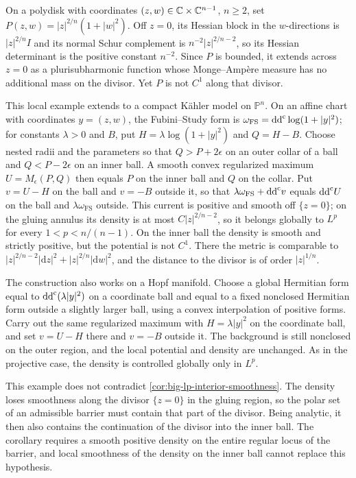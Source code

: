 \begin{example}\label{ex:compact-pogorelov}
On a polydisk with coordinates $(z,w)\in\mathbb C\times\mathbb C^{n-1}$, $n\geq2$, set $P(z,w)=|z|^{2/n}(1+|w|^2)$. Off $z=0$, its Hessian block in the $w$-directions is $|z|^{2/n}I$ and its normal Schur complement is $n^{-2}|z|^{2/n-2}$, so its Hessian determinant is the positive constant $n^{-2}$. Since $P$ is bounded, it extends across $z=0$ as a plurisubharmonic function whose Monge--Amp\`ere measure has no additional mass on the divisor. Yet $P$ is not $C^1$ along that divisor.

This local example extends to a compact K\"ahler model on $\mathbb P^n$. On an affine chart with coordinates $y=(z,w)$, the Fubini--Study form is $\omega_{\mathrm{FS}}=\mathrm{dd}^{\mathrm{c}}\log(1+|y|^2)$; for constants $\lambda>0$ and $B$, put $H=\lambda\log(1+|y|^2)$ and $Q=H-B$. Choose nested radii and the parameters so that $Q>P+2\epsilon$ on an outer collar of a ball and $Q<P-2\epsilon$ on an inner ball. A smooth convex regularized maximum $U=M_\epsilon(P,Q)$ then equals $P$ on the inner ball and $Q$ on the collar. Put $v=U-H$ on the ball and $v=-B$ outside it, so that $\lambda\omega_{\mathrm{FS}}+\mathrm{dd}^{\mathrm{c}} v$ equals $\mathrm{dd}^{\mathrm{c}} U$ on the ball and $\lambda\omega_{\mathrm{FS}}$ outside. This current is positive and smooth off $\{z=0\}$; on the gluing annulus its density is at most $C|z|^{2/n-2}$, so it belongs globally to $L^p$ for every $1<p<n/(n-1)$. On the inner ball the density is smooth and strictly positive, but the potential is not $C^1$. There the metric is comparable to $|z|^{2/n-2}|\mathrm{d} z|^2+|z|^{2/n}|\mathrm{d} w|^2$, and the distance to the divisor is of order $|z|^{1/n}$.

The construction also works on a Hopf manifold. Choose a global Hermitian form equal to $\mathrm{dd}^{\mathrm{c}}(\lambda|y|^2)$ on a coordinate ball and equal to a fixed nonclosed Hermitian form outside a slightly larger ball, using a convex interpolation of positive forms. Carry out the same regularized maximum with $H=\lambda|y|^2$ on the coordinate ball, and set $v=U-H$ there and $v=-B$ outside it. The background is still nonclosed on the outer region, and the local potential and density are unchanged. As in the projective case, the density is controlled globally only in $L^p$.
\end{example}

This example does not contradict \cref{cor:big-lp-interior-smoothness}. The density loses smoothness along the divisor $\{z=0\}$ in the gluing region, so the polar set of an admissible barrier must contain that part of the divisor. Being analytic, it then also contains the continuation of the divisor into the inner ball. The corollary requires a smooth positive density on the entire regular locus of the barrier, and local smoothness of the density on the inner ball cannot replace this hypothesis.

